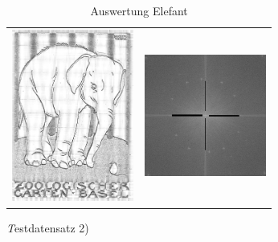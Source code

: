 \documentclass[12pt,german]{article}
\begin{document}
\begin{table}[H]
\begin{tabular}{c | c}
    \includegraphics[width=4cm]{../testData/Results/Elefant/reducedElefant.jpg} & \includegraphics[width=4cm]{../testData/Results/Elefant/reducedFFT_of_Elefant.jpg} \\
  \end{tabular}
  \caption{Auswertung Elefant}
  \label{tab:AuswertungElefant}
\end{table}

\textit Testdatensatz 2)
\end{document}
